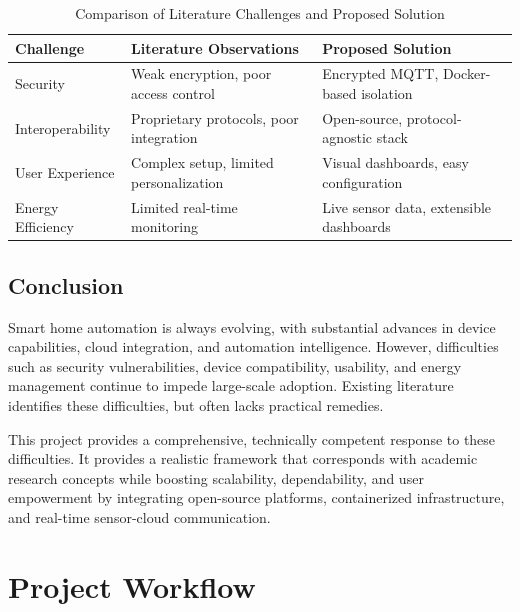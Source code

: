 \documentclass[a4paper,12pt]{report}
\begin{document}
\begin{table}[htbp]
    \centering
    \renewcommand{\arraystretch}{1.5} %
    \setlength{\tabcolsep}{8pt}       %
    \begin{tabular}{|>{\centering\arraybackslash}m{3cm}|
                    >{\centering\arraybackslash}m{5.5cm}|
                    >{\centering\arraybackslash}m{5.5cm}|}
    \hline
    \textbf{Challenge} & \textbf{Literature Observations} & \textbf{Proposed Solution} \\
    \hline
    Security & Weak encryption, poor access control & Encrypted MQTT, Docker-based isolation \\
    \hline
    Interoperability & Proprietary protocols, poor integration & Open-source, protocol-agnostic stack \\
    \hline
    User Experience & Complex setup, limited personalization & Visual dashboards, easy configuration \\
    \hline
    Energy Efficiency & Limited real-time monitoring & Live sensor data, extensible dashboards \\
    \hline
    
    \end{tabular}
    \caption{Comparison of Literature Challenges and Proposed Solution}
    \label{tab:comparison}

\end{table}
    

 
\section{Conclusion}
Smart home automation is always evolving, with substantial advances in device capabilities, cloud integration, and automation intelligence.  However, difficulties such as security vulnerabilities, device compatibility, usability, and energy management continue to impede large-scale adoption.  Existing literature identifies these difficulties, but often lacks practical remedies.

This project provides a comprehensive, technically competent response to these difficulties.  It provides a realistic framework that corresponds with academic research concepts while boosting scalability, dependability, and user empowerment by integrating open-source platforms, containerized infrastructure, and real-time sensor-cloud communication.

\chapter{Project Workflow}
\end{document}
